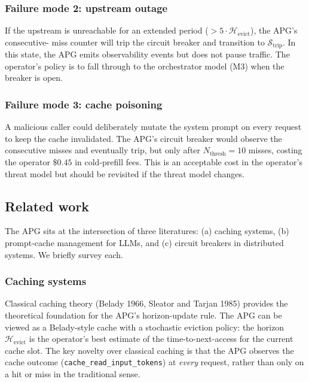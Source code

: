 \subsubsection{Failure mode 2: upstream outage}

If the upstream is unreachable for an extended period
($> 5 \cdot \mathcal{H}_{\text{evict}}$), the APG's consecutive-
miss counter will trip the circuit breaker and transition to
$\mathcal{S}_{\text{trip}}$. In this state, the APG emits
observability events but does not pause traffic. The
operator's policy is to fall through to the orchestrator
model (M3) when the breaker is open.

\subsubsection{Failure mode 3: cache poisoning}

A malicious caller could deliberately mutate the system prompt
on every request to keep the cache invalidated. The APG's
circuit breaker would observe the consecutive misses and
eventually trip, but only after $N_{\text{thresh}} = 10$
misses, costing the operator $\$0.45$ in cold-prefill fees.
This is an acceptable cost in the operator's threat model but
should be revisited if the threat model changes.

\subsection{Related work}
\label{app:apg:related}

The APG sits at the intersection of three literatures: (a)
caching systems, (b) prompt-cache management for LLMs, and
(c) circuit breakers in distributed systems. We briefly
survey each.

\subsubsection{Caching systems}

Classical caching theory (Belady 1966, Sleator and Tarjan
1985) provides the theoretical foundation for the APG's
horizon-update rule. The APG can be viewed as a Belady-style
cache with a stochastic eviction policy: the horizon
$\mathcal{H}_{\text{evict}}$ is the operator's best estimate
of the time-to-next-access for the current cache slot. The
key novelty over classical caching is that the APG observes
the cache outcome (\texttt{cache\_read\_input\_tokens}) at
\emph{every} request, rather than only on a hit or miss in
the traditional sense.

